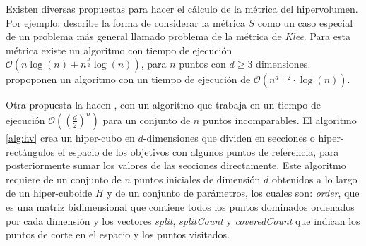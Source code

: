   Existen diversas propuestas para hacer el c\'alculo de la m\'etrica del hipervolumen. Por ejemplo: \cite{Beume2009} 
  describe la forma de considerar la m\'etrica $S$ como un caso especial de un problema m\'as general llamado 
  problema de la m\'etrica de \textit{Klee}. Para esta m\'etrica  existe un algoritmo con tiempo de ejecuci\'on 
  $\mathcal{O}(n\log(n) + n^{\frac{d}{2}}\log (n))$, para $n$ puntos con $d\geq 3$ dimensiones. \cite{FonPaqhypervolume} 
  propoponen un algoritmo con un tiempo de ejecuci\'on de $\mathcal{O}(n^{d-2}\cdot\log (n))$. 
  
  Otra propuesta la hacen \cite{YangNovel}, con un algoritmo que trabaja en un tiempo de ejecuci\'on $\mathcal{O}((\frac{d}{2})^n)$ para un conjunto de $n$ puntos incomparables. El algoritmo \ref{alg:hv}
  crea un hiper-cubo en $d$-dimensiones que dividen en secciones o hiper-rect\'angulos el espacio de los objetivos con algunos 
  puntos de referencia, para posteriormente sumar los valores de las secciones directamente. Este algoritmo requiere de un conjunto 
  de $n$ puntos iniciales de dimensi\'on $d$ obtenidos a lo largo de un hiper-cuboide $H$ y de un conjunto de par\'ametros, 
  los cuales son: \textit{order}, que es una matriz bidimensional que contiene todos los puntos dominados ordenados 
  por cada dimensi\'on y los vectores \textit{split}, \textit{splitCount} y \textit{coveredCount} que indican los puntos 
  de corte en el espacio y los puntos visitados.
 
